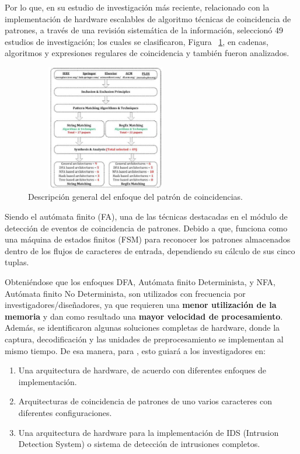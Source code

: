 \documentclass[10pt,conference]{IEEEtran}
\begin{document}
    Por lo que,  en su estudio de investigación más reciente, relacionado con la implementación de hardware escalables de algoritmo técnicas de coincidencia de patrones, a través de una revisión sistemática de la información, seleccionó 49 estudios de investigación; los cuales se clasificaron, Figura ~\ref{Tec.2}, en cadenas, algoritmos y expresiones regulares de coincidencia y también fueron analizados.

    \begin{figure}[H]
    \begin{center}
    \includegraphics[width=7cm, height=5.5cm]{Ind.Tecnolo/Patron.JPG}
    \caption{Descripción general del enfoque del patrón de coincidencias.}
    \label{Tec.2} 
    \end{center}
    \end{figure}
    
    Siendo el autómata finito (FA), una de las técnicas destacadas en el módulo de detección de eventos de coincidencia de patrones. Debido a que, funciona como una máquina de estados finitos (FSM) para reconocer los patrones almacenados dentro de los flujos de caracteres de entrada, dependiendo su cálculo de sus cinco tuplas.
    
    Obteniéndose que los enfoques DFA, Autómata finito Determinista, y NFA, Autómata finito No Determinista, son utilizados con frecuencia por investigadores/diseñadores, ya que requieren una \textbf{menor utilización de la memoria} y dan como resultado una \textbf{mayor velocidad de procesamiento}. Además, se identificaron algunas soluciones completas de hardware, donde la captura, decodificación y las unidades de preprocesamiento 
    se implementan al mismo tiempo. De esa manera, para \cite[p.~16]{aliyu2021management}, esto guiará a los investigadores en: 
    \begin{enumerate}
        \item Una arquitectura de hardware, de acuerdo con diferentes enfoques de implementación. 
        \item Arquitecturas de coincidencia de patrones de uno varios caracteres con diferentes configuraciones.
        \item Una arquitectura de hardware para la implementación de IDS (Intrusion Detection System) o sistema de detección de intrusiones completos.
    \end{enumerate}
\end{document}
